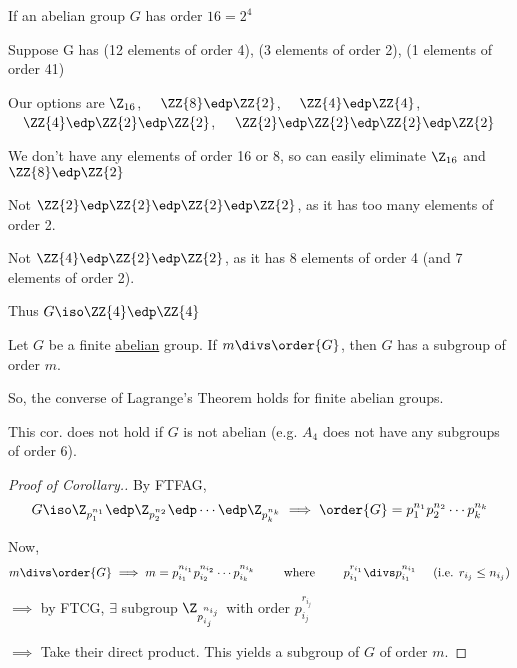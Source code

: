 \begin{example}
If an abelian group \(G\) has order \(16 = 2^4\)

Suppose G has (12 elements of order 4), (3 elements of order 2), (1 elements of order 41)

Our options are \(\Z_{16}\), \(\quad \ZZ{8}\edp\ZZ{2}\), \(\quad\ZZ{4}\edp\ZZ{4}\), \(\quad\ZZ{4}\edp\ZZ{2}\edp\ZZ{2}\), \(\quad\ZZ{2}\edp\ZZ{2}\edp\ZZ{2}\edp\ZZ{2}\)

We don't have any elements of order 16 or 8, so can easily eliminate \(\Z_{16}\) and \(\ZZ{8}\edp\ZZ{2}\)

Not \(\ZZ{2}\edp\ZZ{2}\edp\ZZ{2}\edp\ZZ{2}\), as it has too many elements of order 2.

Not \(\ZZ{4}\edp\ZZ{2}\edp\ZZ{2}\), as it has 8 elements of order 4 (and 7 elements of order 2).

Thus \(G \iso \ZZ{4}\edp\ZZ{4}\)
\end{example}

\begin{corollary}
Let \(G\) be a finite \ul{abelian} group. If \(m\divs \order{G}\), then \(G\) has a subgroup of order \(m\).
\end{corollary}

So, the converse of Lagrange's Theorem holds for finite abelian groups.

\begin{remark}
This cor. does not hold if \(G\) is not abelian (e.g. \(A_4\) does not have any subgroups of order \(6\)).
\end{remark}

\begin{proof}[Proof of Corollary.]

By FTFAG, \begin{align*}
G \iso \Z_{p_1^{n_1}} \edp \Z_{p_2^{n_2}} \edp \cdots \edp \Z_{p_k^{n_k}} \implies \order{G} = p_1^{n_1}p_2^{n_2}\cdots p_k^{n_k}
\end{align*}

Now, \begin{align*}
m\divs\order{G} \implies m = p_{i_1}^{n_{i_1}}p_{i_2}^{n_{i_2}}\cdots p_{i_k}^{n_{i_k}}
\qquad \text{ where } \qquad
p_{i_1}^{r_{i_1}} \divs p_{i_1}^{n_{i_1}} \quad \text{ (i.e. \(r_{i_j}\leq n_{i_j}\))}
\end{align*}

\(\implies\) by FTCG, \(\exists\) subgroup \(\Z_{p_{i_j}^{n_{i_j}}}\) with order \(p_{i_j}^{r_{i_j}}\)

\(\implies\) Take their direct product. This yields a subgroup of \(G\) of order \(m\).
\end{proof}

